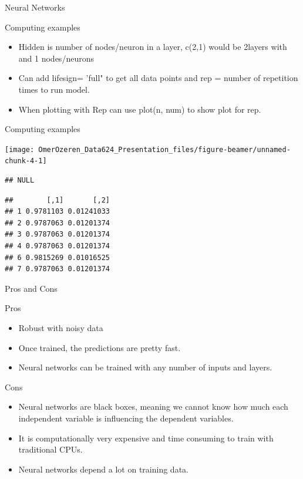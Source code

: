 \documentclass[ignorenonframetext,]{beamer}
\providecommand{\tightlist}{%
  \setlength{\itemsep}{0pt}\setlength{\parskip}{0pt}}
\begin{document}
\begin{frame}[fragile]{Neural Networks}
\begin{block}{Computing examples}
\begin{itemize}
\tightlist
\item
  Hidden is number of nodes/neuron in a layer, c(2,1) would be 2layers
  with and 1 nodes/neurons
\item
  Can add lifesign= 'full" to get all data points and rep = number of
  repetition times to run model.
\item
  When plotting with Rep can use plot(n, num) to show plot for rep.
\end{itemize}

\end{block}

\begin{block}{Computing examples}

\begin{center}\texttt{[image: OmerOzeren\_Data624\_Presentation\_files/figure-beamer/unnamed-chunk-4-1]} \end{center}

\begin{verbatim}
## NULL
\end{verbatim}

\begin{verbatim}
##        [,1]       [,2]
## 1 0.9781103 0.01241033
## 2 0.9787063 0.01201374
## 3 0.9787063 0.01201374
## 4 0.9787063 0.01201374
## 6 0.9815269 0.01016525
## 7 0.9787063 0.01201374
\end{verbatim}

\end{block}

\begin{block}{Pros and Cons}

\begin{block}{Pros}

\begin{itemize}
\tightlist
\item
  Robust with noisy data
\item
  Once trained, the predictions are pretty fast.
\item
  Neural networks can be trained with any number of inputs and layers.
\end{itemize}

\end{block}

\begin{block}{Cons}

\begin{itemize}
\tightlist
\item
  Neural networks are black boxes, meaning we cannot know how much each
  independent variable is influencing the dependent variables.
\item
  It is computationally very expensive and time consuming to train with
  traditional CPUs.
\item
  Neural networks depend a lot on training data.
\end{itemize}

\end{block}

\end{block}

\end{frame}
\end{document}
